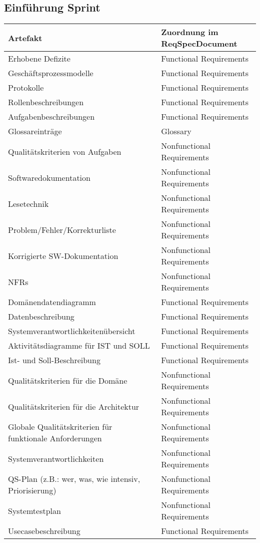 \documentclass[ngerman]{scrartcl}
\title{\mytitle}
\author{\myauthor}
\newcommand{\blattnummer}{10}												%
\newcommand{\aufgabe}{4}
\newcommand{\f}{Functional Requirements}
\newcommand{\n}{Nonfunctional Requirements}
\newcommand{\g}{Glossary}
\begin{document}
	\setcounter{section}{\blattnummer}
	\setcounter{subsection}{\aufgabe-1}
	\subsection{Einführung Sprint}


	\begin{tiny}

	\begin{longtable}{|l|l|}
		\hline
		Artefakt & Zuordnung im ReqSpecDocument\\
		\hline
		\hline
		Erhobene Defizite & \f\\
		\hline
		Geschäftsprozessmodelle & \f\\
		\hline
		Protokolle & \f\\
		\hline
		Rollenbeschreibungen & \f\\
		\hline
		Aufgabenbeschreibungen & \f\\
		\hline
		Glossareinträge & \g\\
		\hline
		Qualitätskriterien von Aufgaben & \n\\
		\hline
		Softwaredokumentation & \n\\
		\hline
		Lesetechnik & \n\\
		\hline
		Problem/Fehler/Korrekturliste & \n\\
		\hline
		Korrigierte SW-Dokumentation & \n\\
		\hline
		NFRs & \n\\
		\hline
		Domänendatendiagramm & \f\\
		\hline
		Datenbeschreibung & \f\\
		\hline
		Systemverantwortlichkeitenübersicht & \f\\
		\hline
		Aktivitätsdiagramme für IST und SOLL & \f\\
		\hline
		Ist- und Soll-Beschreibung & \f\\
		\hline
		Qualitätskriterien für die Domäne & \n\\
		\hline
		Qualitätskriterien für die Architektur & \n\\
		\hline
		Globale Qualitätskriterien für funktionale Anforderungen & \n\\
		\hline
		Systemverantwortlichkeiten & \n\\
		\hline
		QS-Plan (z.B.: wer, was, wie intensiv, Priorisierung) & \n\\
		\hline
		Systemtestplan & \n\\
		\hline
		Usecasebeschreibung & \f\\

\end{longtable}
\end{tiny}
\end{document}
